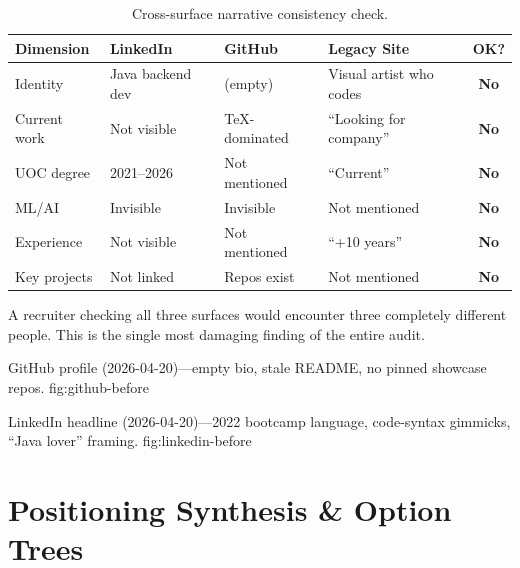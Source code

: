 \documentclass[a4paper,11pt,openany]{report}
\begin{document}
\begin{table}[htbp]
\centering
\caption{Cross-surface narrative consistency check.}
\label{tab:consistency}
\small
\begin{tabularx}{\textwidth}{l l l l c}
\toprule
\textbf{Dimension} & \textbf{LinkedIn} & \textbf{GitHub} & \textbf{Legacy Site} & \textbf{OK?} \\
\midrule
Identity     & Java backend dev   & (empty)         & Visual artist who codes & \textbf{No} \\
Current work & Not visible        & TeX-dominated   & ``Looking for company'' & \textbf{No} \\
UOC degree   & 2021--2026         & Not mentioned   & ``Current''             & \textbf{No} \\
ML/AI        & Invisible          & Invisible       & Not mentioned           & \textbf{No} \\
Experience   & Not visible        & Not mentioned   & ``+10 years''           & \textbf{No} \\
Key projects & Not linked         & Repos exist     & Not mentioned           & \textbf{No} \\
\bottomrule
\end{tabularx}
\end{table}

A recruiter checking all three surfaces would encounter three completely
different people. This is the single most damaging finding of the entire audit.

%
  {GitHub profile (2026-04-20)---empty bio, stale README, no pinned showcase repos.}%
  {fig:github-before}

%
  {LinkedIn headline (2026-04-20)---2022 bootcamp language, code-syntax gimmicks, ``Java lover'' framing.}%
  {fig:linkedin-before}



\chapter{Positioning Synthesis \& Option Trees}
\label{ch:positioning}
\end{document}
